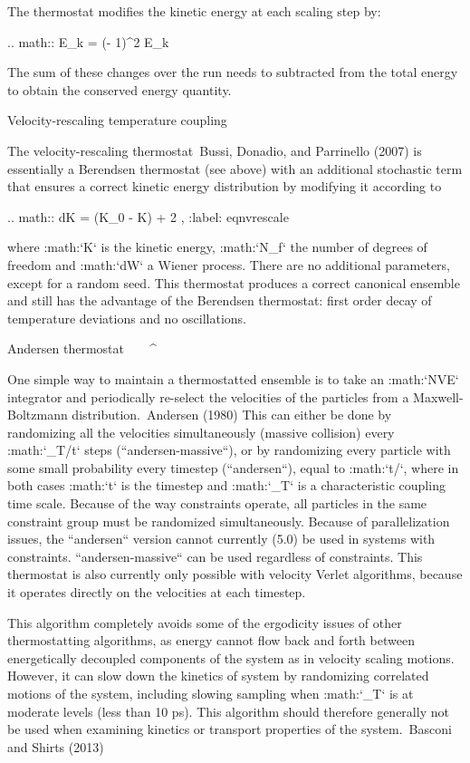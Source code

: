 The thermostat modifies the kinetic energy at each scaling step by:

.. math:: \Delta E_k = (\lambda - 1)^2 E_k

The sum of these changes over the run needs to subtracted from the
total energy to obtain the conserved energy quantity.

Velocity-rescaling temperature coupling
^^^^^^^^^^^^^^^^^^^^^^^^^^^^^^^^^^^^^^^

The velocity-rescaling thermostat Bussi, Donadio, and Parrinello (2007)
is essentially a Berendsen thermostat (see above) with an additional
stochastic term that ensures a correct kinetic energy distribution by
modifying it according to

.. math::  {\mbox{d}}K = (K_0 - K)  + 2  ,
           :label: eqnvrescale

where :math:`K` is the kinetic energy, :math:`N_f` the number of
degrees of freedom and :math:`{\mbox{d}}W` a Wiener process. There are
no additional parameters, except for a random seed. This thermostat
produces a correct canonical ensemble and still has the advantage of the
Berendsen thermostat: first order decay of temperature deviations and no
oscillations.

Andersen thermostat
^^^^^^^^^^^^^^^^^^^

One simple way to maintain a thermostatted ensemble is to take an
:math:`NVE` integrator and periodically re-select the velocities of the
particles from a Maxwell-Boltzmann distribution. Andersen (1980) This
can either be done by randomizing all the velocities simultaneously
(massive collision) every :math:`\tau_T/{{\Delta t}}` steps
(``andersen-massive``), or by randomizing every particle
with some small probability every timestep (``andersen``),
equal to :math:`{{\Delta t}}/\tau`, where in both cases
:math:`{{\Delta t}}` is the timestep and :math:`\tau_T` is a
characteristic coupling time scale. Because of the way constraints
operate, all particles in the same constraint group must be randomized
simultaneously. Because of parallelization issues, the
``andersen`` version cannot currently (5.0) be used in
systems with constraints. ``andersen-massive`` can be used
regardless of constraints. This thermostat is also currently only
possible with velocity Verlet algorithms, because it operates directly
on the velocities at each timestep.

This algorithm completely avoids some of the ergodicity issues of other
thermostatting algorithms, as energy cannot flow back and forth between
energetically decoupled components of the system as in velocity scaling
motions. However, it can slow down the kinetics of system by randomizing
correlated motions of the system, including slowing sampling when
:math:`\tau_T` is at moderate levels (less than 10 ps). This algorithm
should therefore generally not be used when examining kinetics or
transport properties of the system. Basconi and Shirts (2013)

